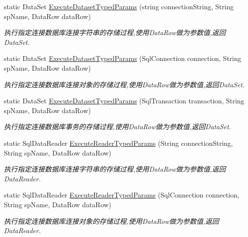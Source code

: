 \begin{DoxyCompactItemize}
static Data\+Set \hyperlink{class_x_c_l_net_tools_1_1_data_base_1_1_m_s_s_q_l_1_1_sql_helper_a7ca275b0a4c125a68d9129118a7fa2e4}{Execute\+Dataset\+Typed\+Params} (string connection\+String, String sp\+Name, Data\+Row data\+Row)
\begin{DoxyCompactList}\small\item\em 执行指定连接数据库连接字符串的存储过程,使用\+Data\+Row做为参数值,返回\+Data\+Set. \end{DoxyCompactList}\item 
static Data\+Set \hyperlink{class_x_c_l_net_tools_1_1_data_base_1_1_m_s_s_q_l_1_1_sql_helper_a99ad32d46796d105b83d64d1d4410adb}{Execute\+Dataset\+Typed\+Params} (Sql\+Connection connection, String sp\+Name, Data\+Row data\+Row)
\begin{DoxyCompactList}\small\item\em 执行指定连接数据库连接对象的存储过程,使用\+Data\+Row做为参数值,返回\+Data\+Set. \end{DoxyCompactList}\item 
static Data\+Set \hyperlink{class_x_c_l_net_tools_1_1_data_base_1_1_m_s_s_q_l_1_1_sql_helper_a20c701f5bf5d0446f1b0e3abca2fdaa3}{Execute\+Dataset\+Typed\+Params} (Sql\+Transaction transaction, String sp\+Name, Data\+Row data\+Row)
\begin{DoxyCompactList}\small\item\em 执行指定连接数据库事务的存储过程,使用\+Data\+Row做为参数值,返回\+Data\+Set. \end{DoxyCompactList}\item 
static Sql\+Data\+Reader \hyperlink{class_x_c_l_net_tools_1_1_data_base_1_1_m_s_s_q_l_1_1_sql_helper_a9d1fe3c152aef1502290da70a2816191}{Execute\+Reader\+Typed\+Params} (String connection\+String, String sp\+Name, Data\+Row data\+Row)
\begin{DoxyCompactList}\small\item\em 执行指定连接数据库连接字符串的存储过程,使用\+Data\+Row做为参数值,返回\+Data\+Reader. \end{DoxyCompactList}\item 
static Sql\+Data\+Reader \hyperlink{class_x_c_l_net_tools_1_1_data_base_1_1_m_s_s_q_l_1_1_sql_helper_aabf34a05a161a10559fcb6cc1e82e462}{Execute\+Reader\+Typed\+Params} (Sql\+Connection connection, String sp\+Name, Data\+Row data\+Row)
\begin{DoxyCompactList}\small\item\em 执行指定连接数据库连接对象的存储过程,使用\+Data\+Row做为参数值,返回\+Data\+Reader. \end{DoxyCompactList}\item 

\end{DoxyCompactItemize}
